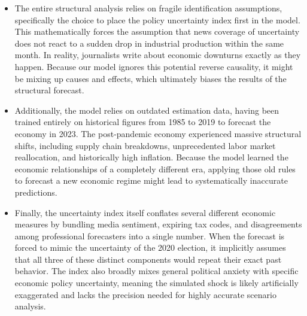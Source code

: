 \documentclass[11pt]{article}
\begin{document}
\begin{itemize}
    \item The entire structural analysis relies on fragile identification assumptions, specifically the choice to place the policy uncertainty index 
    first in the model. This mathematically forces the assumption that news coverage of uncertainty does not react to a sudden drop in industrial
    production within the same month. In reality, journalists write about economic downturns exactly as they happen. Because our model ignores this 
    potential reverse causality, it might be mixing up causes and effects, which ultimately biases the results of the structural forecast.
    \item Additionally, the model relies on outdated estimation data, having been trained entirely on historical figures from 1985 to 2019 to forecast 
    the economy in 2023. The post-pandemic economy experienced massive structural shifts, including supply chain breakdowns, unprecedented labor 
    market reallocation, and historically high inflation. Because the model learned the economic relationships of a completely different era, 
    applying those old rules to forecast a new economic regime might lead to systematically inaccurate predictions.
    \item Finally, the uncertainty index itself conflates several different economic measures by bundling media sentiment, expiring tax codes, and 
    disagreements among professional forecasters into a single number. When the forecast is forced to mimic the uncertainty of the 2020 election, 
    it implicitly assumes that all three of these distinct components would repeat their exact past behavior. The index also broadly mixes general 
    political anxiety with specific economic policy uncertainty, meaning the simulated shock is likely artificially exaggerated and lacks the 
    precision needed for highly accurate scenario analysis.
\end{itemize}
\end{document}
